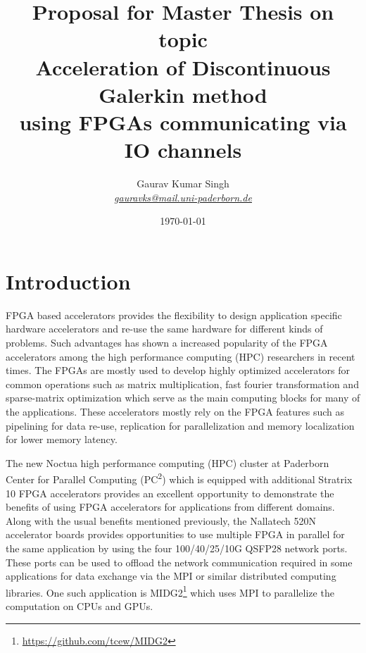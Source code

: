 \documentclass[english,notitlepage]{hgbreport}
\author{Gaurav Kumar Singh \\ \textit{\href{mailto:gauravks@mail.uni-paderborn.de}{gauravks@mail.uni-paderborn.de}}}
\title{Proposal for Master Thesis on topic \\
		Acceleration of Discontinuous Galerkin method \\
		using FPGAs communicating via IO channels}
\date{\today}
\begin{document}
\maketitle

\section{Introduction}

FPGA based accelerators provides the flexibility to design application specific hardware accelerators and re-use the same
hardware for different kinds of problems. Such advantages has shown a increased popularity of the FPGA accelerators among
the high performance computing (HPC) researchers in recent times. The FPGAs are mostly used to develop highly
optimized accelerators for common operations such as matrix multiplication, fast fourier transformation
and sparse-matrix optimization which serve as the main computing blocks for many of the applications. These accelerators
mostly rely on the FPGA features such as pipelining for data re-use, replication for parallelization and memory localization
for lower memory latency.

The new Noctua high performance computing (HPC) cluster at Paderborn Center for Parallel Computing  (PC\textsuperscript{2})
which is equipped with additional Stratrix 10 FPGA accelerators provides an excellent opportunity to demonstrate the benefits
of using FPGA accelerators for applications from different domains. Along with the usual benefits mentioned previously, the
Nallatech 520N accelerator boards provides opportunities to use multiple FPGA in parallel for the same application by
using the four 100/40/25/10G QSFP28 network ports. These ports can be used to offload the network communication required in
some applications for data exchange via the MPI or similar distributed computing libraries. One such application
is MIDG2\footnote{\url{https://github.com/tcew/MIDG2}} which uses MPI to parallelize the computation on CPUs and GPUs.
\end{document}
